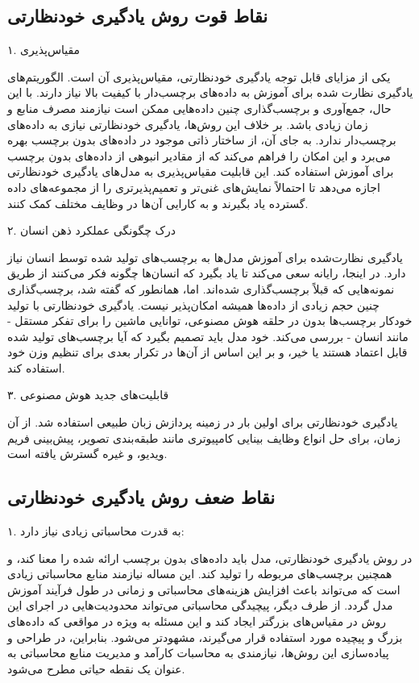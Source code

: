 \subsection{نقاط قوت روش یادگیری خودنظارتی}



۱. مقیاس‌پذیری ‌

یکی از مزایای قابل توجه یادگیری خودنظارتی، مقیاس‌پذیری آن است. الگوریتم‌های یادگیری نظارت شده برای آموزش به داده‌های برچسب‌دار با کیفیت بالا نیاز دارند. با این حال، جمع‌آوری و برچسب‌گذاری چنین داده‌هایی ممکن است نیازمند مصرف منابع و زمان زیادی باشد. بر خلاف این روش‌ها، یادگیری خودنظارتی نیازی به داده‌های برچسب‌دار ندارد. به جای آن، از ساختار ذاتی موجود در داده‌های بدون برچسب بهره می‌برد و این امکان را فراهم می‌کند که از مقادیر انبوهی از داده‌های بدون برچسب برای آموزش استفاده کند. این قابلیت مقیاس‌پذیری به مدل‌های یادگیری خودنظارتی اجازه می‌دهد تا احتمالاً نمایش‌های غنی‌تر و تعمیم‌پذیرتری را از مجموعه‌های داده گسترده یاد بگیرند و به کارایی آن‌ها در وظایف مختلف کمک کنند.

۲. درک چگونگی عملکرد ذهن انسان

یادگیری نظارت‌شده برای آموزش مدل‌ها به برچسب‌های تولید شده توسط انسان نیاز دارد. در اینجا، رایانه سعی می‌کند تا یاد بگیرد که انسان‌ها چگونه فکر می‌کنند از طریق نمونه‌هایی که قبلاً برچسب‌گذاری شده‌اند. اما، همانطور که گفته شد، برچسب‌گذاری چنین حجم زیادی از داده‌ها همیشه امکان‌پذیر نیست. یادگیری خودنظارتی با تولید خودکار برچسب‌ها بدون در حلقه هوش مصنوعی، توانایی ماشین را برای تفکر مستقل - مانند انسان - بررسی می‌کند. خود مدل باید تصمیم بگیرد که آیا برچسب‌های تولید شده قابل اعتماد هستند یا خیر، و بر این اساس از آن‌ها در تکرار بعدی برای تنظیم وزن خود استفاده کند.

۳. قابلیت‌های جدید هوش مصنوعی

یادگیری خودنظارتی برای اولین بار در زمینه پردازش زبان طبیعی استفاده شد. از آن زمان، برای حل انواع وظایف بینایی کامپیوتری مانند طبقه‌بندی تصویر، پیش‌بینی فریم ویدیو، و غیره گسترش یافته است.
  \citep{xie2022self}
\subsection{نقاط ضعف روش یادگیری خودنظارتی}

۱. به قدرت محاسباتی زیادی نیاز دارد:

در روش یادگیری خودنظارتی، مدل باید داده‌های بدون برچسب ارائه شده را معنا کند، و همچنین برچسب‌های مربوطه را تولید کند. این مساله نیازمند منابع محاسباتی زیادی است که می‌تواند باعث افزایش هزینه‌های محاسباتی و زمانی در طول فرآیند آموزش مدل گردد. از طرف دیگر، پیچیدگی محاسباتی می‌تواند محدودیت‌هایی در اجرای این روش در مقیاس‌های بزرگتر ایجاد کند و این مسئله به ویژه در مواقعی که داده‌های بزرگ و پیچیده مورد استفاده قرار می‌گیرند، مشهودتر می‌شود. بنابراین، در طراحی و پیاده‌سازی این روش‌ها، نیازمندی به محاسبات کارآمد و مدیریت منابع محاسباتی به عنوان یک نقطه حیاتی مطرح می‌شود.

